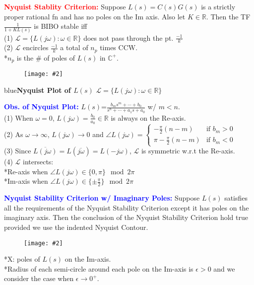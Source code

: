 \documentclass[5pt]{extarticle} %
\newcommand{\customFigure}[3][]{%
    \vspace{-1.5em}
    \begin{figure}[H]
        \centering
        \texttt{[image: \#2]}
    \end{figure}
    \vspace{-1.5em}
}
\begin{document}
\begin{paracol}{3}
{    \textcolor{red}{\textbf{Nyquist Stablity Criterion:}} Suppose $L(s) = C(s) G(s)$ is a strictly proper rational fn and has no poles on the Im axis. Also let $K \in \mathbb{R}$. Then the TF $\frac{1}{1 + K L(s)}$ is BIBO stable iff \\
    (1) $\mathcal{L} = \{ L(j \omega): \omega \in \mathbb{R}\}$ does not pass through the pt. $\frac{-1}{k}$ \\
    (2) $\mathcal{L}$ encircles $\frac{-1}{k}$ a total of $n_p$ times CCW. \\
    *$n_p$ is the \# of poles of $L(s)$ in $\mathbb{C}^+$. 
    \customFigure[0.2]{../Images/L23_0.png}

    \textcolor{blue}{\textbf{Nyquist Plot of $L(s)$}} $\mathcal{L} = \{L(j \omega): \omega \in \mathbb{R}\}$ 

    \textcolor{blue}{\textbf{Obs. of Nyquist Plot:}} $L(s) \text{=} \frac{b_m s^m + \cdots + b_0}{s^n + \cdots + a_1 s + a_0}$ w/ $m < n$. \\
    (1) When $\omega = 0$, $L(j \omega) = \frac{b_0}{a_0} \in \mathbb{R}$ is always on the Re-axis. \\
    (2) As $\omega \rightarrow \infty$, $L(j \omega) \rightarrow 0$ and $\angle L(j \omega) = \begin{cases}
        -\frac{\pi}{2} (n-m) & \text{if } b_m > 0\\
        \pi - \frac{\pi}{2} (n-m) & \text{if } b_m < 0
    \end{cases}$ \\
    (3) Since $\overline{L(j \omega)} = L(\overline{j \omega}) = L(-j \omega)$, $\mathcal{L}$ is symmetric w.r.t the Re-axis. \\
    (4) $\mathcal{L}$ intersects: \\
    *Re-axis when $\angle L(j \omega) \in \{0, \pi\} \mod 2\pi$ \\
    *Im-axis when $\angle L(j \omega) \in \{\pm \frac{\pi}{2}\} \mod 2\pi$ 

    \textcolor{blue}{\textbf{Nyquist Stability Criterion w/ Imaginary Poles:}} Suppose $L(s)$ satisfies all the requirements of the Nyquist Stability Criterion except it has poles on the imaginary axis. Then the conclusion of the Nyquist Stability Criterion hold true provided we use the indented Nyquist Contour. \\
    \customFigure[0.1]{../Images/L23_1.png} \\
    *X: poles of $L(s)$ on the Im-axis. \\
    *Radius of each semi-circle around each pole on the Im-axis is $\epsilon > 0$ and we consider the case when $\epsilon \rightarrow 0^+$. 

}
\end{paracol}
\end{document}
